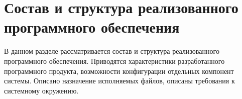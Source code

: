 


\section{Состав и структура реализованного программного обеспечения}
\begin{annotation}
	В данном разделе рассматривается состав и структура реализованного программного обеспечения.
	Приводятся характеристики разработанного программного продукта, возможности конфигурации отдельных
	компонент системы. Описано назначение исполняемых файлов, описаны требования к системному окружению.
\end{annotation}








